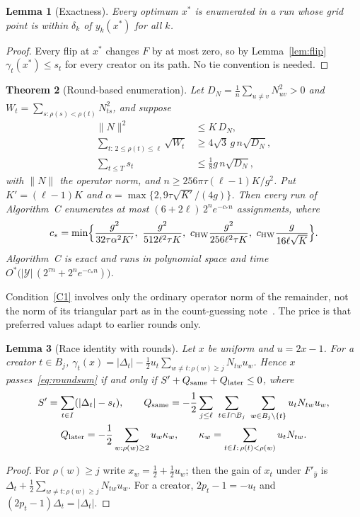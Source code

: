 \documentclass[11pt,a4paper]{article}
\newtheorem{theorem}{Theorem}
\newtheorem{lemma}[theorem]{Lemma}
\theoremstyle{definition}
\theoremstyle{remark}
\newcommand{\Ostar}{O^{*}}
\begin{document}
\begin{lemma}[Exactness]\label{lem:exactC}
Every optimum $x^*$ is enumerated in a run whose grid point is within $\delta_k$
of $y_k(x^*)$ for all $k$.
\end{lemma}
\begin{proof}
Every flip at $x^*$ changes $F$ by at most zero, so by Lemma~\ref{lem:flip}
$\gamma_t(x^*)\le s_t$ for every creator on its path. No tie convention is
needed.
\end{proof}

\begin{theorem}[Round-based enumeration]\label{thm:rounds}
Let $D_N=\frac1n\sum_{u\ne v}N_{uv}^2>0$ and
$W_t=\sum_{s:\rho(s)<\rho(t)}N_{ts}^2$, and suppose
\begin{align}
 \|N\|^2&\le K\,D_N,\tag{C1}\label{C1}\\
 \sum_{t:\,2\le\rho(t)\le\ell}\sqrt{W_t}&\ge4\sqrt3\,g\,n\sqrt{D_N},\tag{C2}\label{C2}\\
 \sum_{t\le T}s_t&\le\tfrac18g\,n\sqrt{D_N},\tag{C3}\label{C3}
\end{align}
with $\|N\|$ the operator norm, and $n\ge256\pi\tau(\ell-1)K/g^2$. Put
$K'=(\ell-1)K$ and $\alpha=\max\{2,9\tau\sqrt{K'}/(4g)\}$. Then every run of
Algorithm~C enumerates at most $(6+2\ell)\,2^ne^{-c_*n}$ assignments, where
\[
 c_*=\min\Bigl\{\frac{g^2}{32\tau\alpha^2K'},\ \frac{g^2}{512\ell^2\tau K},\
 c_{\rm HW}\frac{g^2}{256\ell^2\tau K},\ c_{\rm HW}\frac{g}{16\ell\sqrt K}\Bigr\}.
\]
Algorithm~C is exact and runs in polynomial space and time
$\Ostar\bigl(|\mathcal Y|\,(2^{\tau n}+2^ne^{-c_*n})\bigr)$.
\end{theorem}

Condition~\eqref{C1} involves only the ordinary operator norm of the remainder,
not the norm of its triangular part as in the count-guessing note~\cite{CG}. The
price is that preferred values adapt to earlier rounds only.

\begin{lemma}[Race identity with rounds]\label{lem:race}
Let $x$ be uniform and $u=2x-1$. For a creator $t\in B_j$,
$\gamma_t(x)=|\Delta_t|-\frac12u_t\sum_{w\ne t:\rho(w)\ge j}N_{tw}u_w$. Hence $x$
passes~\eqref{eq:roundsum} if and only if $S'+Q_{\rm same}+Q_{\rm later}\le0$,
where
\begin{gather*}
 S'=\sum_{t\in I}(|\Delta_t|-s_t),\qquad
 Q_{\rm same}=-\frac12\sum_{j\le\ell}\ \sum_{t\in I\cap B_j}\
            \sum_{w\in B_j\setminus\{t\}}u_tN_{tw}u_w,\\
 Q_{\rm later}=-\frac12\sum_{w:\rho(w)\ge2}u_w\kappa_w,\qquad
 \kappa_w=\sum_{t\in I:\,\rho(t)<\rho(w)}u_tN_{tw}.
\end{gather*}
\end{lemma}
\begin{proof}
For $\rho(w)\ge j$ write $x_w=\frac12+\frac12u_w$; then the gain of $x_t$ under
$F'_{\hat y}$ is $\Delta_t+\frac12\sum_{w\ne t:\rho(w)\ge j}N_{tw}u_w$. For a
creator, $2p_t-1=-u_t$ and $(2p_t-1)\Delta_t=|\Delta_t|$.
\end{proof}
\end{document}
